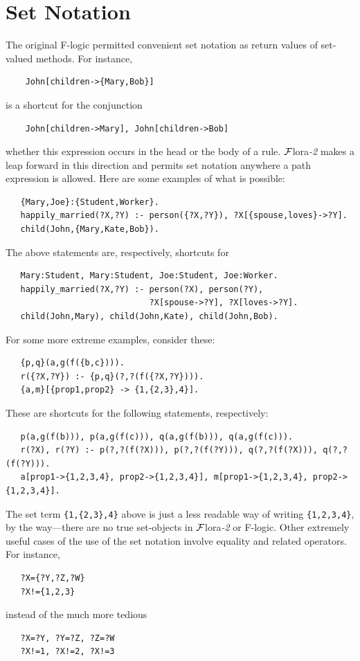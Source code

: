 \documentclass[11pt]{article}
\newcommand{\FLSYSTEM}{{\mbox{\sc ${\cal F}${lora}\rm\emph{-2}}}\xspace}
\begin{document}
\section{Set Notation} \label{sec-sets}

The original F-logic \cite{KLW95} permitted convenient set notation as
return values of set-valued methods. For instance,
\begin{verbatim}
    John[children->{Mary,Bob}]
\end{verbatim}
is a shortcut for the conjunction
\begin{verbatim}
    John[children->Mary], John[children->Bob]
\end{verbatim}
whether this expression occurs in the head or the body of a rule. \FLSYSTEM
makes a leap forward in this direction and permits set notation anywhere a
path expression is allowed. Here are some examples of what is possible:
\begin{verbatim}
   {Mary,Joe}:{Student,Worker}.
   happily_married(?X,?Y) :- person({?X,?Y}), ?X[{spouse,loves}->?Y].
   child(John,{Mary,Kate,Bob}).
\end{verbatim}
The above statements are, respectively, shortcuts for 
\begin{verbatim}
   Mary:Student, Mary:Student, Joe:Student, Joe:Worker.
   happily_married(?X,?Y) :- person(?X), person(?Y),
                             ?X[spouse->?Y], ?X[loves->?Y].
   child(John,Mary), child(John,Kate), child(John,Bob).
\end{verbatim}
For some more extreme examples, consider these:
\begin{verbatim}
   {p,q}(a,g(f({b,c}))).
   r({?X,?Y}) :- {p,q}(?,?(f({?X,?Y}))).
   {a,m}[{prop1,prop2} -> {1,{2,3},4}].
\end{verbatim}
These are shortcuts for the following statements, respectively:
\begin{verbatim}
   p(a,g(f(b))), p(a,g(f(c))), q(a,g(f(b))), q(a,g(f(c))).
   r(?X), r(?Y) :- p(?,?(f(?X))), p(?,?(f(?Y))), q(?,?(f(?X))), q(?,?(f(?Y))).
   a[prop1->{1,2,3,4}, prop2->{1,2,3,4}], m[prop1->{1,2,3,4}, prop2->{1,2,3,4}].
\end{verbatim}
The set term \texttt{\{1,\{2,3\},4\}} above is just a less readable way of
writing \texttt{\{1,2,3,4\}}, by the way---there are no true set-objects in
\FLSYSTEM or F-logic.
Other extremely useful cases of the use of the set notation involve equality and related
operators. For instance,
\begin{verbatim}
   ?X={?Y,?Z,?W}
   ?X!={1,2,3}
\end{verbatim}
instead of the much more tedious
\begin{verbatim}
   ?X=?Y, ?Y=?Z, ?Z=?W
   ?X!=1, ?X!=2, ?X!=3
\end{verbatim}
\end{document}
